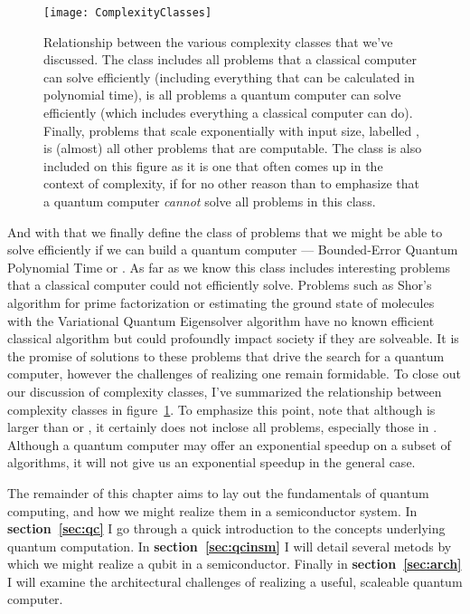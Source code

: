 \begin{figure}
  \texttt{[image: ComplexityClasses]}
  \caption[Relationship between various complexity classes]
  {Relationship between the various complexity classes that we've discussed. The class
   includes all problems that a classical computer can solve efficiently (including
  everything that can be calculated in polynomial time),  is all problems a quantum computer can solve
  efficiently (which includes everything a classical computer can do). Finally, problems that scale exponentially
  with input size, labelled , is (almost) all other problems that are computable. The class
   is also included on this figure as it is one that often comes up in the context of complexity,
  if for no other reason than to emphasize that a quantum computer \emph{cannot} solve all problems in
  this class.}
  \label{fig:complexity}
\end{figure}

And with that we finally define the class of problems that we might be able to solve efficiently if we 
can build a quantum computer --- Bounded-Error Quantum Polynomial Time or . As far as we know
this class includes interesting problems that a classical computer could not efficiently solve. Problems
such as Shor's algorithm for prime factorization\cite{Shor} or estimating the ground state of molecules with
the Variational Quantum Eigensolver algorithm\cite{ncomms5213} have no known efficient classical algorithm
but could profoundly impact society if they are solveable. It is the promise of solutions to these problems
that drive the search for a quantum computer, however the challenges of realizing one remain formidable. To close
out our discussion of complexity classes, I've summarized the relationship between complexity classes in 
figure~\ref{fig:complexity}. To emphasize this point, note that although  is larger than 
or , it certainly does not inclose all problems, especially those in . Although a
quantum computer may offer an exponential speedup on a subset of algorithms, it will not give us an exponential
speedup in the general case.

The remainder of this chapter aims to lay out the fundamentals of quantum computing, and how we might realize
them in a semiconductor system. In \textbf{section~\ref{sec:qc}} I go through a quick introduction to the concepts
underlying quantum computation. In \textbf{section~\ref{sec:qcinsm}} I will detail several metods by which we might
realize a qubit in a semiconductor. Finally in \textbf{section~\ref{sec:arch}} I will examine the architectural
challenges of realizing a useful, scaleable quantum computer.

